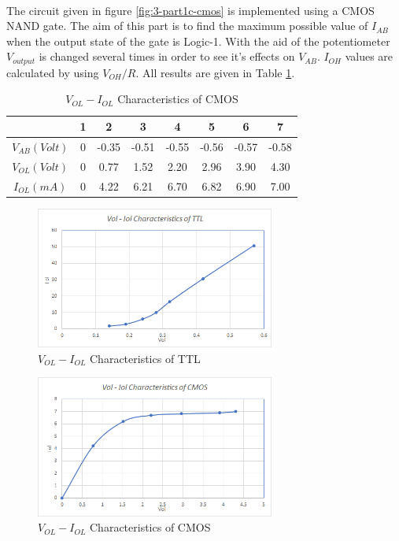 \documentclass[pdftex,12pt,a4paper]{article}
\begin{document}
\begin{flushleft}
\paragraph{}The circuit given in figure \ref{fig:3-part1c-cmos} is implemented using a CMOS NAND gate. The aim of this part is to find the maximum possible value of $I_{AB}$ when the output state of the gate is Logic-1. With the aid of the potentiometer $V_{output}$ is changed several times in order to see it's effects on $V_{AB}$. $I_{OH}$ values are calculated by using $V_{OH}/R$. All results are given in Table \ref{part1c-cmos}.

\begin{table}[h]
\begin{tabular}{c|c|c|c|c|c|c|c|}
                & 1 & 2     & 3     & 4     & 5     & 6     & 7     \\ \hline
$V_{AB} (Volt)$ & 0 & -0.35 & -0.51 & -0.55 & -0.56 & -0.57 & -0.58 \\ \hline
$V_{OL} (Volt)$ & 0 & 0.77  & 1.52  & 2.20  & 2.96  & 3.90  & 4.30  \\ \hline
$I_{OL} (mA)$   & 0 & 4.22  & 6.21  & 6.70  & 6.82  & 6.90  & 7.00 
\end{tabular}
\centering
\caption{$V_{OL} - I_{OL}$ Characteristics of CMOS}
\label{part1c-cmos}
\end{table}
\end{flushleft}


\newpage
 \begin{figure}[h]
    	\centering
    	\includegraphics[width=0.7\textwidth]{charts/part1c-ttl-chart.png}	
    	\caption{$V_{OL} - I_{OL}$ Characteristics of TTL}
    	\label{graph:3-part1c-ttl}
\end{figure}

 \begin{figure}[h]
    	\centering
    	\includegraphics[width=0.7\textwidth]{charts/part1c-cmos-chart.png}	
    	\caption{$V_{OL} - I_{OL}$ Characteristics of CMOS}
    	\label{graph:3-part1c-cmoss}
\end{figure}
\end{document}
